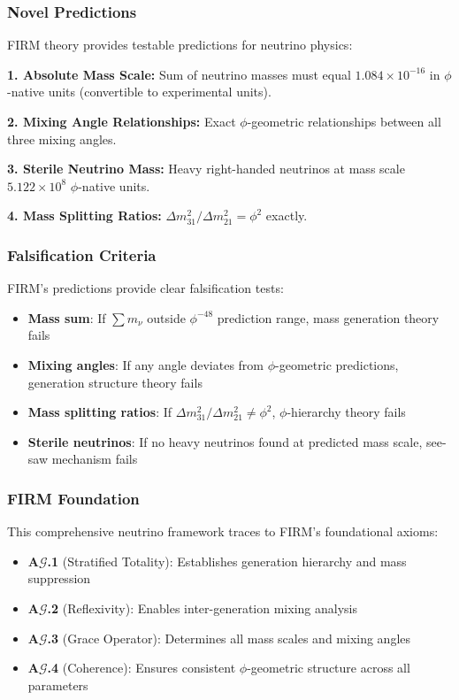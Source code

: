 \subsubsection{Novel Predictions}

FIRM theory provides testable predictions for neutrino physics:

\textbf{1. Absolute Mass Scale:}
Sum of neutrino masses must equal $1.084 \times 10^{-16}$ in $\phi$-native units (convertible to experimental units).

\textbf{2. Mixing Angle Relationships:}
Exact $\phi$-geometric relationships between all three mixing angles.

\textbf{3. Sterile Neutrino Mass:}
Heavy right-handed neutrinos at mass scale $5.122 \times 10^{8}$ $\phi$-native units.

\textbf{4. Mass Splitting Ratios:}
$\Delta m_{31}^2/\Delta m_{21}^2 = \phi^2$ exactly.

\subsubsection{Falsification Criteria}

FIRM's predictions provide clear falsification tests:

\begin{itemize}
\item \textbf{Mass sum}: If $\sum m_\nu$ outside $\phi^{-48}$ prediction range, mass generation theory fails
\item \textbf{Mixing angles}: If any angle deviates from $\phi$-geometric predictions, generation structure theory fails
\item \textbf{Mass splitting ratios}: If $\Delta m_{31}^2/\Delta m_{21}^2 \neq \phi^2$, $\phi$-hierarchy theory fails
\item \textbf{Sterile neutrinos}: If no heavy neutrinos found at predicted mass scale, see-saw mechanism fails
\end{itemize}

\subsubsection{FIRM Foundation}

This comprehensive neutrino framework traces to FIRM's foundational axioms:

\begin{itemize}
\item \textbf{A$\mathcal{G}$.1} (Stratified Totality): Establishes generation hierarchy and mass suppression
\item \textbf{A$\mathcal{G}$.2} (Reflexivity): Enables inter-generation mixing analysis
\item \textbf{A$\mathcal{G}$.3} (Grace Operator): Determines all mass scales and mixing angles
\item \textbf{A$\mathcal{G}$.4} (Coherence): Ensures consistent $\phi$-geometric structure across all parameters
\end{itemize}

